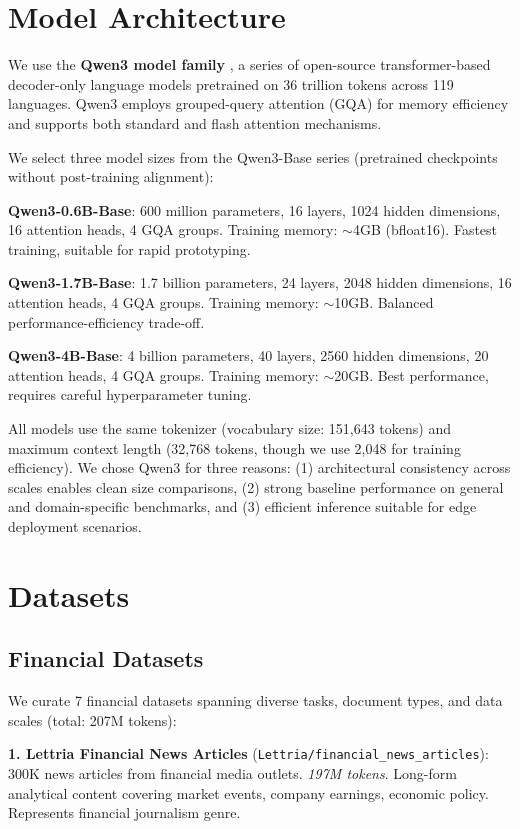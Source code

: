 \section{Model Architecture}

We use the \textbf{Qwen3 model family} \parencite{yang2024qwen3}, a series of open-source transformer-based decoder-only language models pretrained on 36 trillion tokens across 119 languages. Qwen3 employs grouped-query attention (GQA) for memory efficiency and supports both standard and flash attention mechanisms.

We select three model sizes from the Qwen3-Base series (pretrained checkpoints without post-training alignment):

\textbf{Qwen3-0.6B-Base}: 600 million parameters, 16 layers, 1024 hidden dimensions, 16 attention heads, 4 GQA groups. Training memory: $\sim$4GB (bfloat16). Fastest training, suitable for rapid prototyping.

\textbf{Qwen3-1.7B-Base}: 1.7 billion parameters, 24 layers, 2048 hidden dimensions, 16 attention heads, 4 GQA groups. Training memory: $\sim$10GB. Balanced performance-efficiency trade-off.

\textbf{Qwen3-4B-Base}: 4 billion parameters, 40 layers, 2560 hidden dimensions, 20 attention heads, 4 GQA groups. Training memory: $\sim$20GB. Best performance, requires careful hyperparameter tuning.

All models use the same tokenizer (vocabulary size: 151,643 tokens) and maximum context length (32,768 tokens, though we use 2,048 for training efficiency). We chose Qwen3 for three reasons: (1) architectural consistency across scales enables clean size comparisons, (2) strong baseline performance on general and domain-specific benchmarks, and (3) efficient inference suitable for edge deployment scenarios.

\section{Datasets}

\subsection{Financial Datasets}

We curate 7 financial datasets spanning diverse tasks, document types, and data scales (total: 207M tokens):

\textbf{1. Lettria Financial News Articles} (\texttt{Lettria/financial\_news\_articles}): 300K news articles from financial media outlets. \textit{197M tokens}. Long-form analytical content covering market events, company earnings, economic policy. Represents financial journalism genre.

